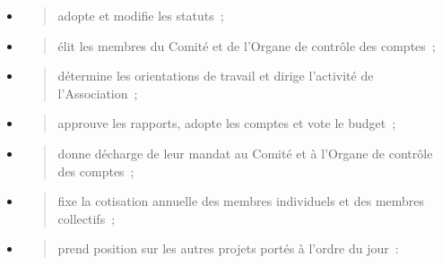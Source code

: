 \documentclass[
]{article}
\begin{document}
\begin{itemize}
\item
  \begin{quote}
  adopte et modifie les statuts~;
  \end{quote}
\item
  \begin{quote}
  élit les membres du Comité et de l'Organe de contrôle des comptes~;
  \end{quote}
\item
  \begin{quote}
  détermine les orientations de travail et dirige l'activité de
  l'Association~;
  \end{quote}
\item
  \begin{quote}
  approuve les rapports, adopte les comptes et vote le budget~;
  \end{quote}
\item
  \begin{quote}
  donne décharge de leur mandat au Comité et à l'Organe de contrôle des
  comptes~;
  \end{quote}
\item
  \begin{quote}
  fixe la cotisation annuelle des membres individuels et des membres
  collectifs~;
  \end{quote}
\item
  \begin{quote}
  prend position sur les autres projets portés à l'ordre du jour~:
  \end{quote}
\end{itemize}
\end{document}

